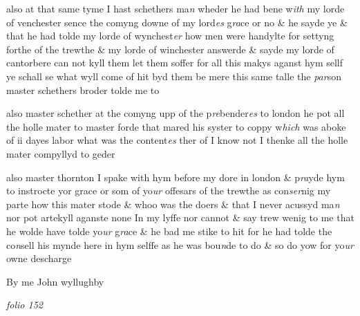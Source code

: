 \documentclass[12pt, a4paper]{book}
\begin{document}
		\ifthenelse{\isodd{\thepage}}
		{\reversemarginpar}
		{\normalmarginpar}
		also at that same tyme I hast schethers ma\textit{n }wheder he had bene
 		w\textit{ith} my lorde of venchester sence the comyng downe of my lord\textit{es}
 			g\textit{ra}ce or no \& he sayde ye \& that he had tolde my lorde of wynchest\textit{er}
 how men were handylte for settyng forthe of the trewthe \&
 		my lorde of winchester answerde \& sayde my lorde of
 			cantorbere can not kyll them let them soffer for all this
 makys aganst hym sellf ye schall se what wyll come of hit
 byd them be mere this same talle the \textit{par}son master schethers
 broder tolde me to
 	
		\ifthenelse{\isodd{\thepage}}
		{\reversemarginpar}
		{\normalmarginpar}
		also master schether at the comyng upp of the p\textit{re}bender\textit{es} to
 		london he pot all the holle mater to master forde that mared
 his syster to coppy w\textit{hich} was aboke of ii dayes labor what was
 the content\textit{es} ther of I know not I thenke all the holle mater
 compyllyd to geder
 	
		\ifthenelse{\isodd{\thepage}}
		{\reversemarginpar}
		{\normalmarginpar}
		also master thornton I spake with hym before my dore in london \& p\textit{ra}yde
 hym to instrocte yor grace or som of yo\textit{ur }offesars of the trewthe as
 con\textit{ser}nig my parte how this mater stode \& whoo was the doers \& that
 I never acussyd ma\textit{n} nor pot artekyll aganste none In my lyffe nor
 cannot \& say trew wenig to me that he wolde have tolde yo\textit{ur} g\textit{ra}ce
 \& he bad me stike to hit for he had tolde the co\textit{n}sell his mynde here
 in hym selffe as he was bou\textit{n}de to do \& so do yow for yo\textit{ur} owne descharge
 	
		\ifthenelse{\isodd{\thepage}}
		{\reversemarginpar}
		{\normalmarginpar}
		By me John wyllughby

\dotfill
						\newpage
{}

\textit{folio 152}


         \vspace*{4cm}
         
\dotfill
						  \section*{}  \subsection*{}
\end{document}
